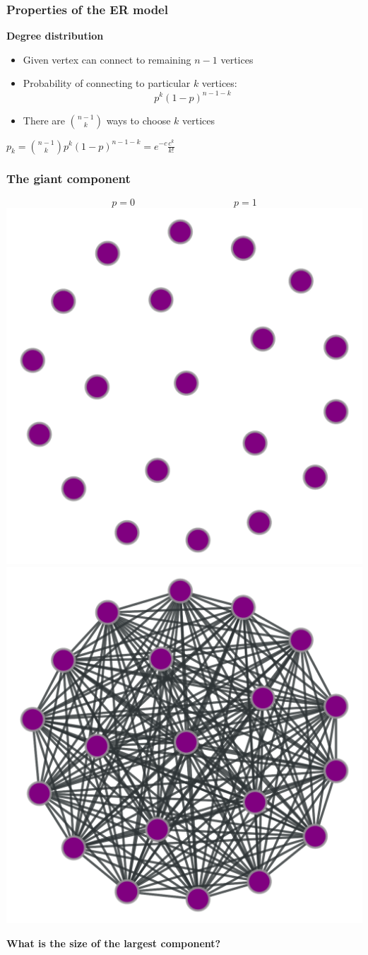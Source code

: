 \documentclass{beamer}
\begin{document}
\begin{frame}
    \frametitle{Properties of the ER model}
    \centering
    {\bf Degree distribution}
    
    \vspace{2em}
    \begin{itemize}
        \setlength\itemsep{1em}
        \item{Given vertex can connect to remaining $n-1$ vertices}
        \item{Probability of connecting to particular $k$ vertices: $$p^k(1-p)^{n-1-k}$$}
        \item{There are $\binom{n-1}{k}$ ways to choose $k$ vertices}
    \end{itemize}
    \vspace{1em}
    $p_k = \binom{n-1}{k}p^k(1-p)^{n-1-k} = e^{-c}\frac{c^k}{k!}$
\end{frame}
\begin{frame}
    \frametitle{The giant component}
    \centering
    $$p = 0 \hspace{10em} p = 1$$
    \includegraphics[width=0.4\columnwidth]{er3.pdf}
    \hspace{2em}
    \includegraphics[width=0.4\columnwidth]{er4.pdf}

    \vspace{1em}
    {\bf What is the size of the largest component?}
\end{frame}
\end{document}

